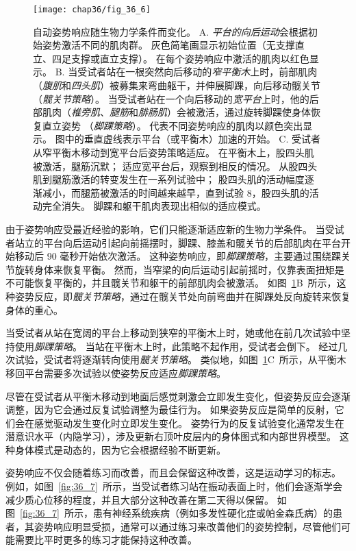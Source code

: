 \begin{figure}[htbp]
	\centering
	\texttt{[image: chap36/fig\_36\_6]}
	\caption{自动姿势响应随生物力学条件而变化。
		A. \textit{平台的向后运动}会根据初始姿势激活不同的肌肉群。
		灰色简笔画显示初始位置（无支撑直立、四足支撑或直立支撑）。
		在每个姿势响应中激活的肌肉以红色显示\cite{dunbar1986neural}。
		B. 当受试者站在一根突然向后移动的\textit{窄平衡木}上时，前部肌肉（\textit{腹肌}和\textit{四头肌}）被募集来弯曲躯干，并伸展脚踝，向后移动髋关节（\textit{髋关节策略}）。
		当受试者站在一个向后移动的\textit{宽平台}上时，他的后部肌肉（\textit{椎旁肌}、\textit{腿筋}和\textit{腓肠肌}）会被激活，通过旋转脚踝使身体恢复直立姿势 （\textit{脚踝策略}）。
		代表不同姿势响应的肌肉以颜色突出显示。
		图中的垂直虚线表示平台（或平衡木）加速的开始。
		C. 受试者从窄平衡木移动到宽平台后姿势策略适应。
		在平衡木上，股四头肌被激活，腿筋沉默；
		适应宽平台后，观察到相反的情况。
		从股四头肌到腿筋激活的转变发生在一系列试验中；
		股四头肌的活动幅度逐渐减小，而腿筋被激活的时间越来越早，直到试验 8，股四头肌的活动完全消失。
		脚踝和躯干肌肉表现出相似的适应模式\cite{horak1986central}。}
	\label{fig:36_6}
\end{figure}


由于姿势响应受最近经验的影响，它们只能逐渐适应新的生物力学条件。
当受试者站立的平台向后运动引起向前摇摆时，脚踝、膝盖和髋关节的后部肌肉在平台开始移动后 90 毫秒开始依次激活。
这种姿势响应，即\textit{脚踝策略}，主要通过围绕踝关节旋转身体来恢复平衡。
然而，当窄梁的向后运动引起前摇时，仅靠表面扭矩是不可能恢复平衡的，并且髋关节和躯干的前部肌肉会被激活。
如图~\ref{fig:36_6}B~所示，这种姿势反应，即\textit{髋关节策略}，通过在髋关节处向前弯曲并在脚踝处反向旋转来恢复身体的重心。


当受试者从站在宽阔的平台上移动到狭窄的平衡木上时，她或他在前几次试验中坚持使用\textit{脚踝策略}。
当站在平衡木上时，此策略不起作用，受试者会倒下。
经过几次试验，受试者将逐渐转向使用\textit{髋关节策略}。
类似地，如图~\ref{fig:36_6}C~所示，从平衡木移回平台需要多次试验以使姿势反应适应\textit{脚踝策略}。


尽管在受试者从平衡木移动到地面后感觉刺激会立即发生变化，但姿势反应会逐渐调整，因为它会通过反复试验调整为最佳行为。
如果姿势反应是简单的反射，它们会在感觉驱动发生变化时立即发生变化。
姿势行为的反复试验变化通常发生在潜意识水平（内隐学习），涉及更新右顶叶皮层内的身体图式和内部世界模型。
这种身体模式是动态的，因为它会根据经验不断更新。


姿势响应不仅会随着练习而改善，而且会保留这种改善，这是运动学习的标志。
例如，如图~\ref{fig:36_7}~所示，当受试者练习站在振动表面上时，他们会逐渐学会减少质心位移的程度，并且大部分这种改善在第二天得以保留。
如图~\ref{fig:36_7}~所示，患有神经系统疾病（例如多发性硬化症或帕金森氏病）的患者，其姿势响应明显受损，通常可以通过练习来改善他们的姿势控制，尽管他们可能需要比平时更多的练习才能保持这种改善。


